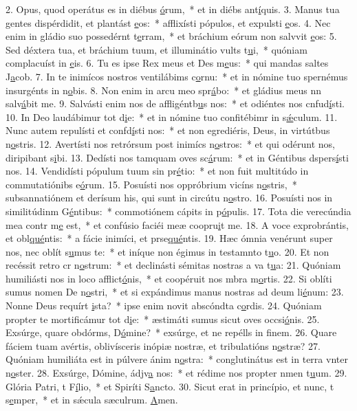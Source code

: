2. Opus, quod operátus es in diébus \uline{ó}rum,~* et in diébs ant\uline{í}quis.
3. Manus tua gentes dispérdidit, et plantást \uline{e}os:~* afflixísti pópulos, et expulsti \uline{e}os.
4. Nec enim in gládio suo possedérnt t\uline{e}rram,~* et bráchium eórum non salvvit \uline{e}os:
5. Sed déxtera tua, et bráchium tuum, et illuminátio vults t\uline{u}i,~* quóniam complacuíst in \uline{e}is.
6. Tu es ipse Rex meus et Des m\uline{e}us:~* qui mandas saltes J\uline{a}cob.
7. In te inimícos nostros ventilábims c\uline{o}rnu:~* et in nómine tuo spernémus insurgénts in n\uline{o}bis.
8. Non enim in arcu meo spr\uline{á}bo:~* et gládius meus nn salv\uline{á}bit me.
9. Salvásti enim nos de affligéntb\uline{u}s nos:~* et odiéntes nos cnfud\uline{í}sti.
10. In Deo laudábimur tot d\uline{i}e:~* et in nómine tuo confitébimr in s\uline{ǽ}culum.
11. Nunc autem repulísti et confd\uline{í}sti nos:~* et non egrediéris, Deus, in virtútbus n\uline{o}stris.
12. Avertísti nos retrórsum post inimícs n\uline{o}stros:~* et qui odérunt nos, diripibant s\uline{i}bi.
13. Dedísti nos tamquam oves sc\uline{á}rum:~* et in Géntibus dspers\uline{í}sti nos.
14. Vendidísti pópulum tuum sin pr\uline{é}tio:~* et non fuit multitúdo in commutatiónibs e\uline{ó}rum.
15. Posuísti nos oppróbrium vicíns n\uline{o}stris,~* subsannatiónem et derísum his, qui sunt in circútu n\uline{o}stro.
16. Posuísti nos in similitúdinm G\uline{é}ntibus:~* commotiónem cápits in p\uline{ó}pulis.
17. Tota die verecúndia mea contr m\uline{e} est,~* et confúsio faciéi meæ coopru\uline{i}t me.
18. A voce exprobrántis, et obl\uline{qué}ntis:~* a fácie inimíci, et prse\uline{qué}ntis.
19. Hæc ómnia venérunt super nos, nec oblít s\uline{u}mus te:~* et iníque non égimus in testamnto t\uline{u}o.
20. Et non recéssit retro cr n\uline{o}strum:~* et declinásti sémitas nostras a va t\uline{u}a:
21. Quóniam humiliásti nos in loco afflict\uline{ó}nis,~* et coopéruit nos mbra m\uline{o}rtis.
22. Si oblíti sumus nomen De n\uline{o}stri,~* et si expándimus manus nostras ad deum li\uline{é}num:
23. Nonne Deus requírt \uline{i}sta?~* ipse enim novit abscóndta c\uline{o}rdis.
24. Quóniam propter te mortificámur tot d\uline{i}e:~* æstimáti sumus sicut oves occsi\uline{ó}nis.
25. Exsúrge, quare obdórms, D\uline{ó}mine?~* exsúrge, et ne repélls in f\uline{i}nem.
26. Quare fáciem tuam avértis, oblivísceris inópiæ nostræ, et tribulatións n\uline{o}stræ?
27. Quóniam humiliáta est in púlvere ánim n\uline{o}stra:~* conglutinátus est in terra vnter n\uline{o}ster.
28. Exsúrge, Dómine, ádjv\uline{a} nos:~* et rédime nos propter nmen t\uline{u}um.
29. Glória Patri, t F\uline{í}lio,~* et Spiríti S\uline{a}ncto.
30. Sicut erat in princípio, et nunc, t s\uline{e}mper,~* et in sǽcula sæculrum. \uline{A}men.
